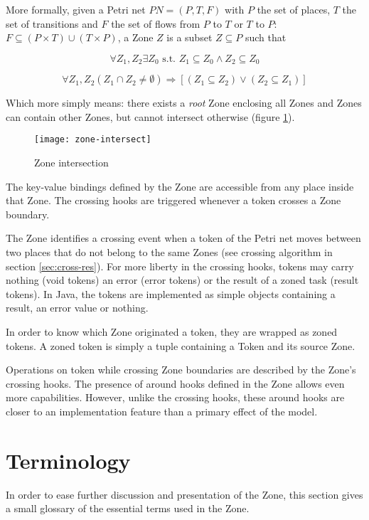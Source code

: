 More formally, given a Petri net $PN = (P, T, F)$ with $P$ the set of places, $T$ the set of transitions and $F$ the set of flows from $P$ to $T$ or $T$ to $P$: $F \subseteq (P \times T) \cup (T \times P)$, a Zone $Z$ is a subset $Z \subseteq P$ such that

$$\forall Z_1, Z_2 \exists Z_0 \text{ s.t. } Z_1 \subseteq Z_0 \land Z_2 \subseteq Z_0 $$

$$\forall Z_1, Z_2 (Z_1 \cap Z_2 \neq \emptyset) \Rightarrow [(Z_1 \subseteq Z_2) \lor (Z_2 \subseteq Z_1)] $$

Which more simply means: there exists a \emph{root} Zone enclosing all Zones and Zones can contain other Zones, but cannot intersect otherwise (figure \ref{fig:zinter}).

\begin{figure}[h]
  \centering
  \texttt{[image: zone-intersect]}
  \caption{Zone intersection}
  \label{fig:zinter}
\end{figure}

The key-value bindings defined by the Zone are accessible from any place inside that Zone. The crossing hooks are triggered whenever a token crosses a Zone boundary.

The Zone identifies a crossing event when a token of the Petri net moves between two places that do not belong to the same Zones (see crossing algorithm in section \ref{sec:cross-res}). For more liberty in the crossing hooks, tokens may carry nothing (void tokens) an error (error tokens) or the result of a zoned task (result tokens). In Java, the tokens are implemented as simple objects containing a result, an error value or nothing.

In order to know which Zone originated a token, they are wrapped as zoned tokens. A zoned token is simply a tuple containing a Token and its source Zone.

Operations on token while crossing Zone boundaries are described by the Zone's crossing hooks.
The presence of around hooks defined in the Zone allows even more capabilities. However, unlike the crossing hooks, these around hooks are closer to an implementation feature than a primary effect of the model.

\section{Terminology}

In order to ease further discussion and presentation of the Zone, this section gives a small glossary of the essential terms used in the Zone.


